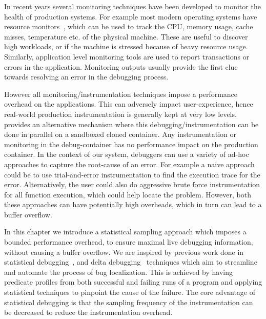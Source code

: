 In recent years several monitoring techniques have been developed to monitor the health of production systems.
For example most modern operating systems have resource monitors~\cite{linuxHealth, windowsHealth, macHealth}, which can be used to track the CPU, memory usage, cache misses, temperature etc. of the physical machine.
These are useful to discover high workloads, or if the machine is stressed because of heavy resource usage.
Similarly, application level monitoring tools are used to report transactions or errors in the application.
Monitoring outputs usually provide the first clue towards resolving an error in the debugging process.

However all monitoring/instrumentation techniques impose a performance overhead on the applications.
This can adversely impact user-experience, hence real-world production instrumentation is generally kept at very low levels.
\parikshan provides an alternative mechanism where this debugging/instrumentation can be done in parallel on a sandboxed cloned container.
Any instrumentation or monitoring in the debug-container has no performance impact on the production container.
In the context of our system, debuggers can use a variety of ad-hoc approaches to capture the root-cause of an error.
For example a naive approach could be to use trial-and-error instrumentation to find the execution trace for the error.
Alternatively, the user could also do aggressive brute force instrumentation for all function execution, which could help locate the problem.
However, both these approaches can have potentially high overheads, which in turn can lead to a buffer overflow.

In this chapter we introduce a statistical sampling approach which imposes a bounded performance overhead, to ensure maximal live debugging information, without causing a buffer overflow.
We are inspired by previous work done in statistical debugging~\cite{cbi}, and delta debugging~\cite{delta} techniques which aim to streamline and automate the process of bug localization.
This is achieved by having predicate profiles from both successful and failing runs of a program and applying statistical techniques to pinpoint the cause of the failure.
The core advantage of statistical debugging is that the sampling frequency of the instrumentation can be decreased to reduce the instrumentation overhead.

